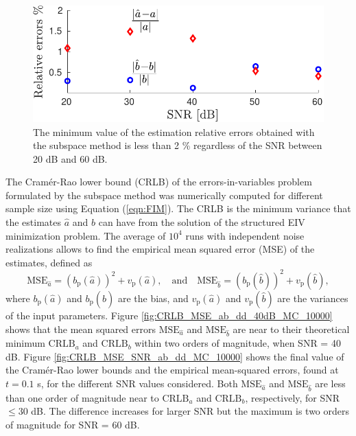 \begin{figure}[!htbp]
\centering
\includegraphics[width=0.69\columnwidth]{./ChapterRampInput/fig/Fig_4.pdf} 
\caption{ \label{fig:rele_SNR_dd_10000} The minimum value of the estimation relative errors obtained with the subspace method is less than 2  \% regardless of the SNR between 20 dB and 60 dB. }
\end{figure}

The Cram\'er-Rao lower bound (CRLB) of the errors-in-variables problem formulated by the subspace method was numerically computed for different sample size using Equation (\ref{eqn:FIM}).
The CRLB is the minimum variance that the estimates $\widehat{a}$ and $\widehat{b}$ can have from the solution of the structured EIV minimization problem. 
The average of $10^4$ runs with independent noise realizations allows to find the empirical mean squared error (MSE) of the estimates, defined as
\begin{equation} \mathrm{MSE}_{\widehat{a}} = \left(b_{\mathrm{p}}\left( \widehat{a} \right) \right)^2 + v_{\mathrm{p}} \left( \widehat{a} \right), \quad \text{and} \quad  \mathrm{MSE}_{\widehat{b}} = ( b_{\mathrm{p}} ( \widehat{b} ) )^2 + v_{\mathrm{p}} ( \widehat{b} ), \end{equation}
where $b_{\mathrm{p}} \left( \widehat{a} \right)$ and $b_{\mathrm{p}} ( \widehat{b} )$ are the bias, and $v_{\mathrm{p}} \left( \widehat{a} \right)$ and $v_{\mathrm{p}} ( \widehat{b} )$ are the variances of the input parameters.
Figure \ref{fig:CRLB_MSE_ab_dd_40dB_MC_10000} shows that the mean squared errors $\mathrm{MSE}_{\hat{a}}$ and $\mathrm{MSE}_{\hat{b}}$ are near to their theoretical minimum $\mathrm{CRLB}_{a}$ and $\mathrm{CRLB}_{b}$ within two orders of magnitude, when SNR = 40 dB.
Figure \ref{fig:CRLB_MSE_SNR_ab_dd_MC_10000} shows the final value of the Cram\'er-Rao lower bounds and the empirical mean-squared errors, found at $t=0.1$ s, for the different SNR values considered.
Both $\mathrm{MSE}_{\hat{a}}$ and $\mathrm{MSE}_{\hat{b}}$ are less than one order of magnitude near to $\mathrm{CRLB}_a$ and $\mathrm{CRLB}_{b}$, respectively, for SNR $\leq 30$ dB.
The difference increases for larger SNR but the maximum is two orders of magnitude for SNR = 60 dB.


